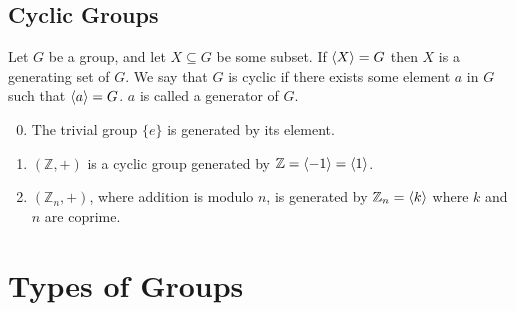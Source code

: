 \documentclass{article}
\begin{document}
\subsection{Cyclic Groups}
\begin{definition}
    Let $G$ be a group, and let $X \subseteq G$ be some subset. If $\langle X \rangle = G$ then $X$ is a generating set of $G$. We say that $G$ is cyclic if there exists some element $a$ in $G$ such that $\langle a \rangle = G$. $a$ is called a generator of $G$.
\end{definition}
\begin{enumerate}
    \setcounter{enumi}{-1}
    \item The trivial group $\{ e \}$ is generated by its element.
    \item $(\mathbb Z, +)$ is a cyclic group generated by $\mathbb Z = \langle -1 \rangle = \langle 1 \rangle$.
    \item $(\mathbb Z_n, +)$, where addition is modulo $n$, is generated by $\mathbb Z_n = \langle k \rangle$ where $k$ and $n$ are coprime.
\end{enumerate}

\section{Types of Groups}
\end{document}
